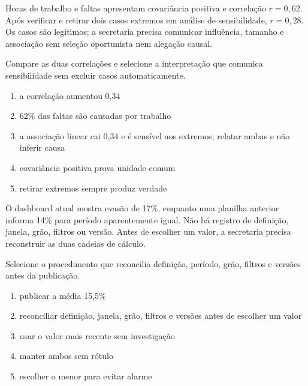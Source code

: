 
\TextoBase

Horas de trabalho e faltas apresentam covariância positiva e correlação $r=0,62$. Após verificar e retirar dois casos extremos em análise de sensibilidade, $r=0,28$. Os casos são legítimos; a secretaria precisa comunicar influência, tamanho e associação sem seleção oportunista nem alegação causal.

\FonteDidatica

\Comando Compare as duas correlações e selecione a interpretação que comunica sensibilidade sem excluir casos automaticamente.

\begin{enumerate}[label=\Alph*)]

\item a correlação aumentou 0,34

\item 62\% das faltas são causadas por trabalho

\item a associação linear cai 0,34 e é sensível aos extremos; relatar ambas e não inferir causa

\item covariância positiva prova unidade comum

\item retirar extremos sempre produz verdade

\end{enumerate}


\TextoBase

O dashboard atual mostra evasão de 17\%, enquanto uma planilha anterior informa 14\% para período aparentemente igual. Não há registro de definição, janela, grão, filtros ou versão. Antes de escolher um valor, a secretaria precisa reconstruir as duas cadeias de cálculo.

\FonteDidatica

\Comando Selecione o procedimento que reconcilia definição, período, grão, filtros e versões antes da publicação.

\begin{enumerate}[label=\Alph*)]

\item publicar a média 15,5\%

\item reconciliar definição, janela, grão, filtros e versões antes de escolher um valor

\item usar o valor mais recente sem investigação

\item manter ambos sem rótulo

\item escolher o menor para evitar alarme

\end{enumerate}


